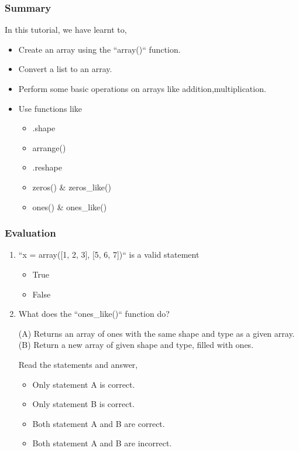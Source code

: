 \documentclass[presentation]{beamer}
\begin{document}
\begin{frame}
\frametitle{Summary}
\label{sec-9}

  In this tutorial, we have learnt to,

\begin{itemize}
\item Create an array using the ``array()`` function.
\item Convert a list to an array.
\item Perform some basic operations on arrays like addition,multiplication.
\item Use functions like
\begin{itemize}
\item .shape
\item arrange()
\item .reshape
\item zeros() \& zeros\_like()
\item ones() \& ones\_like()
\end{itemize}
\end{itemize}
\end{frame}
\begin{frame}
\frametitle{Evaluation}
\label{sec-10}


\begin{enumerate}
\item ``x = array([1, 2, 3], [5, 6, 7])`` is a valid statement
\begin{itemize}
\item True
\item False
\end{itemize}
\vspace{4pt}
\item What does the ``ones\_like()`` function do?
   
     (A) Returns an array of ones with the same shape and type as a
         given array.\\
     (B) Return a new array of given shape and type, filled with ones.
\vspace{6pt}     

     Read the statements and answer,
\begin{itemize}
\item Only statement A is correct.
\item Only statement B is correct.
\item Both statement A and B are correct.
\item Both statement A and B are incorrect.
\end{itemize}
\end{enumerate}
\end{frame}
\end{document}
